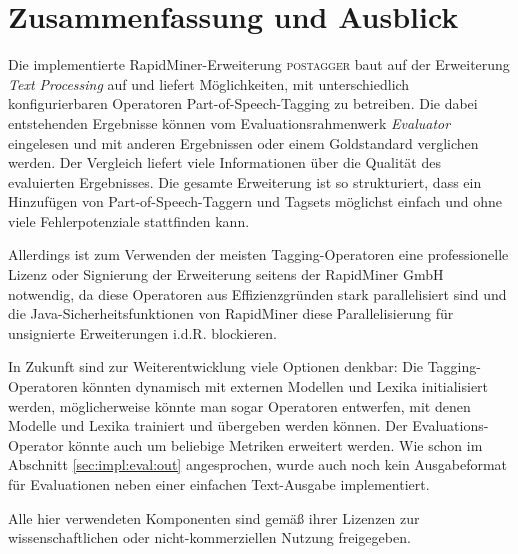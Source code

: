 %
\chapter{Zusammenfassung und Ausblick}
\label{sec:conclusion}

Die implementierte RapidMiner-Erweiterung \textsc{postagger} baut auf der Erweiterung \textit{Text Processing} auf und liefert Möglichkeiten, mit unterschiedlich konfigurierbaren Operatoren Part-of-Speech-Tagging zu betreiben. Die dabei entstehenden Ergebnisse können vom Evaluationsrahmenwerk \textit{Evaluator} eingelesen und mit anderen Ergebnissen oder einem Goldstandard verglichen werden. Der Vergleich liefert viele Informationen über die Qualität des evaluierten Ergebnisses. Die gesamte Erweiterung ist so strukturiert, dass ein Hinzufügen von Part-of-Speech-Taggern und Tagsets möglichst einfach und ohne viele Fehlerpotenziale stattfinden kann.

Allerdings ist zum Verwenden der meisten Tagging-Operatoren eine professionelle Lizenz oder Signierung der Erweiterung seitens der RapidMiner GmbH notwendig, da diese Operatoren aus Effizienzgründen stark parallelisiert sind und die Java-Sicherheitsfunktionen von RapidMiner diese Parallelisierung für unsignierte Erweiterungen i.d.R. blockieren.

In Zukunft sind zur Weiterentwicklung viele Optionen denkbar: Die Tagging-Operatoren könnten dynamisch mit externen Modellen und Lexika initialisiert werden, möglicherweise könnte man sogar Operatoren entwerfen, mit denen Modelle und Lexika trainiert und übergeben werden können. Der Evaluations-Operator könnte auch um beliebige Metriken erweitert werden. Wie schon im Abschnitt \ref{sec:impl:eval:out} angesprochen, wurde auch noch kein Ausgabeformat für Evaluationen neben einer einfachen Text-Ausgabe implementiert.

Alle hier verwendeten Komponenten sind gemäß ihrer Lizenzen zur wissenschaftlichen oder nicht-kommerziellen Nutzung freigegeben.